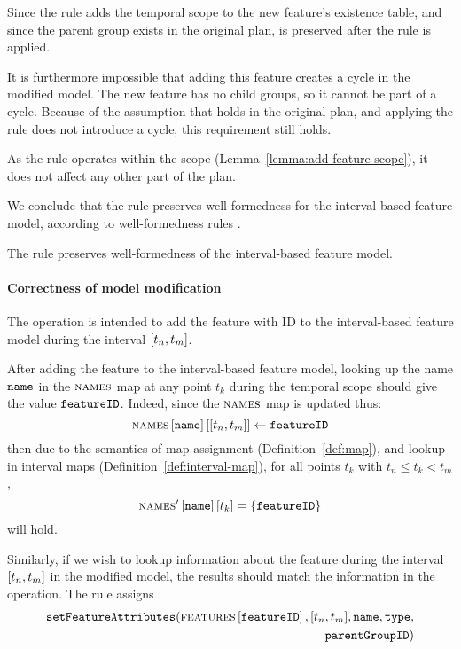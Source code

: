 Since the rule adds the temporal scope to the new feature's existence table, and since the parent group exists in the original plan,  is preserved after the rule is applied.

It is furthermore impossible that adding this feature creates a cycle in the modified model. The new feature has no child groups, so it cannot be part of a cycle. Because of the assumption that  holds in the original plan, and applying the rule does not introduce a cycle, this requirement still holds. 

As the rule operates within the scope (Lemma~\vref{lemma:add-feature-scope}), it does not affect any other part of the plan.

We conclude that the  rule preserves well-formedness for the interval-based feature model, according to well-formedness rules . 
\\
\begin{lemma}
   The  rule preserves well-formedness of the interval-based feature model.
   \label{lemma:add-feature-well-formed}
\end{lemma}

\paragraph{Correctness of model modification}

The operation is intended to add the feature with ID  to the interval-based feature model during the interval $\interval{t_n}{t_m}$. 

After adding the feature to the interval-based feature model, looking up the name $\texttt{name}$ in the $\textsc{names}{}$ map at any point $t_k$ during the temporal scope should give the value $\texttt{featureID}$. Indeed, since the $\textsc{names}{}$ map is updated thus:
\[
   \lookup{\lookup{\names}{\var{name}}}{\interval{t_n}{t_m}} \assign \var{featureID}
\]
then due to the semantics of map assignment (Definition~\vref{def:map}), and lookup in interval maps (Definition~\vref{def:interval-map}), for all points $t_k$ with $t_n \leq t_k < t_m$,
\[
   \textsc{names}' \left[ \texttt{name} \right] \left[ t_k \right] = \left\{\texttt{featureID}\right\}
\]
will hold.

Similarly, if we wish to lookup information about the feature during the interval $\interval{t_n}{t_m}$ in the modified model, the results should match the information in the operation. The rule assigns 
\begin{equation*}
   \begin{split}
   \var{setFeatureAttributes}(\lookup{\features{}}{\var{featureID}}, \interval{t_n}{t_m}, \var{name}, \var{type}, \\
   \var{parentGroupID})
   \end{split}
\end{equation*}

